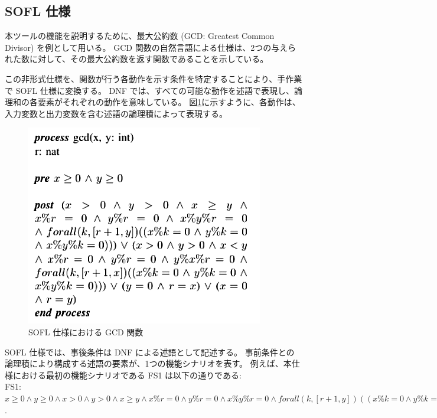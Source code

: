 \documentclass[uplatex, twocolumn, 10pt]{jsarticle} %
\begin{document}
\subsection{SOFL 仕様}
本ツールの機能を説明するために、最大公約数 (GCD: Greatest Common Divisor) を例として用いる。
GCD 関数の自然言語による仕様は、2つの与えられた数に対して、その最大公約数を返す関数であることを示している。

この非形式仕様を、関数が行う各動作を示す条件を特定することにより、手作業で SOFL 仕様に変換する。
DNF では、すべての可能な動作を述語で表現し、論理和の各要素がそれぞれの動作を意味している。
図\ref{fig:GCD_function}に示すように、各動作は、入力変数と出力変数を含む述語の論理積によって表現する。

\begin{figure}[tp]
    \begin{center}
        \includegraphics[width=\linewidth]{../image/Automatic_Generation_of_Test/GCD_function2.png}
        \caption{SOFL 仕様における GCD 関数}
        \label{fig:GCD_function}
    \end{center}
\end{figure}

SOFL 仕様では、事後条件は DNF による述語として記述する。
事前条件との論理積により構成する述語の要素が、1つの機能シナリオを表す。
例えば、本仕様における最初の機能シナリオである FS1 は以下の通りである:\\

FS1: $x \geq 0 \land y \geq 0 \land x > 0 \land y > 0 \land x \geq y \land x\%r = 0 \land y\%r = 0 \land x\%y\%r = 0 \land forall(k,[r+1,y])((x\%k = 0 \land y\%k = 0 \land x\%y\%k = 0))$.\\
\end{document}
